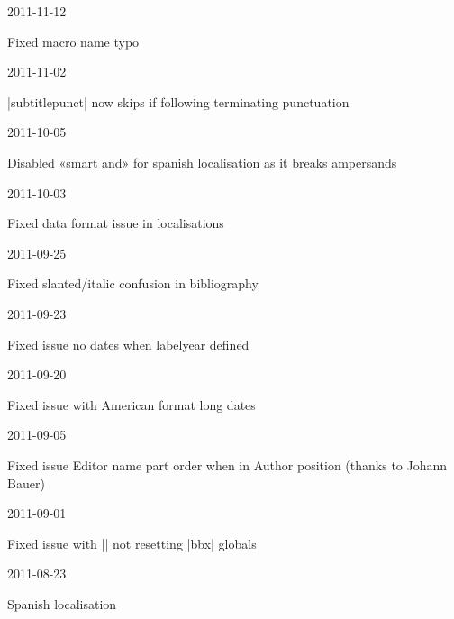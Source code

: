 \documentclass{ltxdockit}
\begin{document}
\begin{changelog}

\begin{release}{4.2}{2011-11-12}
\item Fixed macro name typo
\end{release}

\begin{release}{4.1}{2011-11-02}
\item |subtitlepunct| now skips if following terminating punctuation
\end{release}

\begin{release}{4.0}{2011-10-05}
\item Disabled «smart and» for spanish localisation as it breaks ampersands
\end{release}

\begin{release}{3.9}{2011-10-03}
\item Fixed data format issue in localisations
\end{release}

\begin{release}{3.8}{2011-09-25}
\item Fixed slanted/italic confusion in bibliography
\end{release}

\begin{release}{3.7}{2011-09-23}
\item Fixed issue no dates when labelyear defined
\end{release}

\begin{release}{3.6}{2011-09-20}
\item Fixed issue with American format long dates
\end{release}

\begin{release}{3.5}{2011-09-05}
\item Fixed issue Editor name part order when in Author position (thanks to
  Johann Bauer)
\end{release}

\begin{release}{3.4}{2011-09-01}
\item Fixed issue with |\fullcite| not resetting |bbx| globals
\end{release}

\begin{release}{3.3}{2011-08-23}
\item Spanish localisation
\end{release}


\end{changelog}
\end{document}
